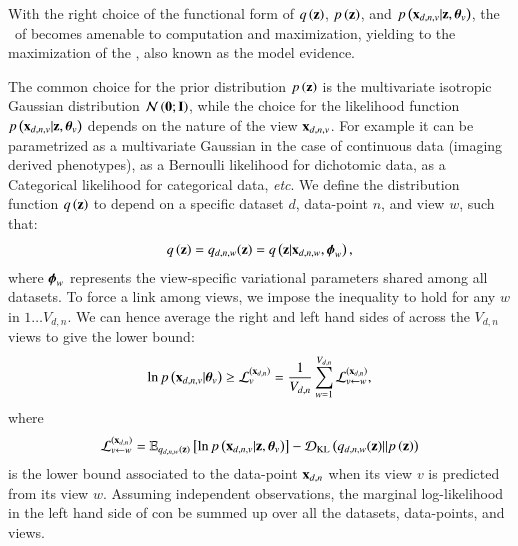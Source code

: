 With the right choice of the functional form of $q\left(\mathbf{z}\right)$, $p\left(\mathbf{z}\right)$, and $p\left(\mathbf{x}_{d,n,v}|\mathbf{z}, \boldsymbol{\theta}_v\right)$, the \rhs\ of  becomes amenable to computation and maximization, yielding to the maximization of the \lhs, also known as the model evidence.

The common choice for the prior distribution $p\left(\mathbf{z}\right)$ is the multivariate isotropic Gaussian distribution $\mathcal{N}\left(\mathbf{0};\mathbf{I}\right)$,
while the choice for the likelihood function $p\left(\mathbf{x}_{d,n,v}|\mathbf{z}, \boldsymbol{\theta}_v\right)$ depends on the nature of the view $\mathbf{x}_{d,n,v}$.
For example it can be parametrized as a multivariate Gaussian in the case of continuous data (\ie imaging derived phenotypes), as a Bernoulli likelihood for dichotomic data, as a Categorical likelihood for categorical data, \textit{etc}.
We define the distribution function $q\left(\mathbf{z}\right)$ to depend on a specific dataset $d$, data-point $n$, and view $w$, such that:
\begin{equation}\label{eq:q}
\begin{aligned}
q\left(\mathbf{z}\right) = q_{d,n,w}(\mathbf{z}) = q\left(\mathbf{z}|\mathbf{x}_{d,n,w}, \boldsymbol{\phi}_w\right),
\end{aligned}
\end{equation}
where $\boldsymbol{\phi}_w$ represents the view-specific variational parameters shared among all datasets.
To force a link among views, we impose the inequality  to hold for any $w$ in $1 \ldots V_{d,n}$.
We can hence average the right and left hand sides of  across the $V_{d,n}$ views to give the lower bound:
\begin{equation}\label{eq:newLB}
\begin{aligned}
\ln p\left(\mathbf{x}_{d,n,v}|\boldsymbol{\theta}_v\right) \geq \mathcal{L}_v^{(\mathbf{x}_{d,n})} = \frac{1}{V_{d,n}} \sum_{w=1}^{V_{d,n}} \mathcal{L}_{v \leftarrow w}^{(\mathbf{x}_{d,n})},
\end{aligned}
\end{equation}
where
\begin{equation}\label{eq:LBdnvw}
\begin{aligned}
\mathcal{L}_{v \leftarrow w}^{(\mathbf{x}_{d,n})} = \operatorname{\mathbb{E}}_{q_{d,n,w}(\mathbf{z})}\left[\ln p\left(\mathbf{x}_{d,n,v}|\mathbf{z}, \boldsymbol{\theta}_v\right)\right] - \operatorname{\mathcal{D}_{KL}}\left(q_{d,n,w}(\mathbf{z})||p\left(\mathbf{z}\right)\right)
\end{aligned}
\end{equation}
is the lower bound associated to the data-point $\mathbf{x}_{d,n}$ when its view $v$ is predicted from its view $w$.
Assuming independent observations, the marginal log-likelihood in the left hand side of  con be summed up over all the datasets, data-points, and views.
